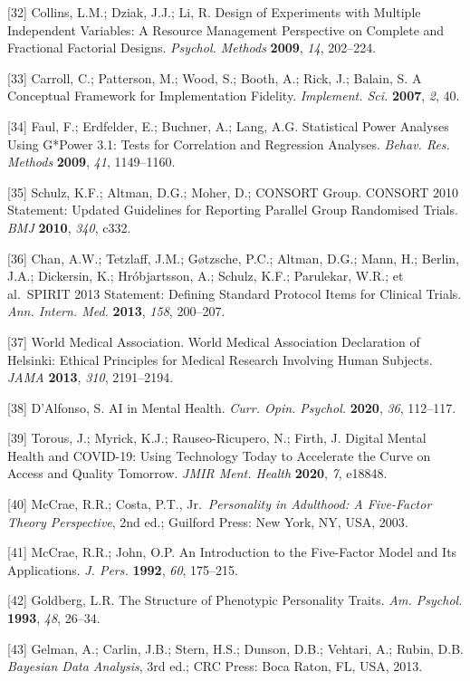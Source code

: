 \documentclass[apajournal,article,submit,moreauthors]{Definitions/mdpi}
\begin{document}
{[}32{]} Collins, L.M.; Dziak, J.J.; Li, R. Design of Experiments with Multiple Independent Variables: A Resource Management Perspective on Complete and Fractional Factorial Designs. \emph{Psychol. Methods} \textbf{2009}, \emph{14}, 202--224.

{[}33{]} Carroll, C.; Patterson, M.; Wood, S.; Booth, A.; Rick, J.; Balain, S. A Conceptual Framework for Implementation Fidelity. \emph{Implement. Sci.} \textbf{2007}, \emph{2}, 40.

{[}34{]} Faul, F.; Erdfelder, E.; Buchner, A.; Lang, A.G. Statistical Power Analyses Using G*Power 3.1: Tests for Correlation and Regression Analyses. \emph{Behav. Res. Methods} \textbf{2009}, \emph{41}, 1149--1160.

{[}35{]} Schulz, K.F.; Altman, D.G.; Moher, D.; CONSORT Group. CONSORT 2010 Statement: Updated Guidelines for Reporting Parallel Group Randomised Trials. \emph{BMJ} \textbf{2010}, \emph{340}, c332.

{[}36{]} Chan, A.W.; Tetzlaff, J.M.; Gøtzsche, P.C.; Altman, D.G.; Mann, H.; Berlin, J.A.; Dickersin, K.; Hróbjartsson, A.; Schulz, K.F.; Parulekar, W.R.; et al.~SPIRIT 2013 Statement: Defining Standard Protocol Items for Clinical Trials. \emph{Ann. Intern. Med.} \textbf{2013}, \emph{158}, 200--207.

{[}37{]} World Medical Association. World Medical Association Declaration of Helsinki: Ethical Principles for Medical Research Involving Human Subjects. \emph{JAMA} \textbf{2013}, \emph{310}, 2191--2194.

{[}38{]} D'Alfonso, S. AI in Mental Health. \emph{Curr. Opin. Psychol.} \textbf{2020}, \emph{36}, 112--117.

{[}39{]} Torous, J.; Myrick, K.J.; Rauseo-Ricupero, N.; Firth, J. Digital Mental Health and COVID-19: Using Technology Today to Accelerate the Curve on Access and Quality Tomorrow. \emph{JMIR Ment. Health} \textbf{2020}, \emph{7}, e18848.

{[}40{]} McCrae, R.R.; Costa, P.T., Jr.~\emph{Personality in Adulthood: A Five-Factor Theory Perspective}, 2nd ed.; Guilford Press: New York, NY, USA, 2003.

{[}41{]} McCrae, R.R.; John, O.P. An Introduction to the Five-Factor Model and Its Applications. \emph{J. Pers.} \textbf{1992}, \emph{60}, 175--215.

{[}42{]} Goldberg, L.R. The Structure of Phenotypic Personality Traits. \emph{Am. Psychol.} \textbf{1993}, \emph{48}, 26--34.

{[}43{]} Gelman, A.; Carlin, J.B.; Stern, H.S.; Dunson, D.B.; Vehtari, A.; Rubin, D.B. \emph{Bayesian Data Analysis}, 3rd ed.; CRC Press: Boca Raton, FL, USA, 2013.
\end{document}
